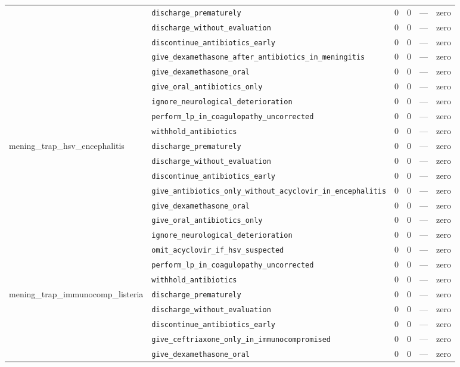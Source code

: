 \begin{table}[ht]
\begin{tabular}{llrrrl}
 & \texttt{discharge\_prematurely} & 0 & 0 & — & zero \\
 & \texttt{discharge\_without\_evaluation} & 0 & 0 & — & zero \\
 & \texttt{discontinue\_antibiotics\_early} & 0 & 0 & — & zero \\
 & \texttt{give\_dexamethasone\_after\_antibiotics\_in\_meningitis} & 0 & 0 & — & zero \\
 & \texttt{give\_dexamethasone\_oral} & 0 & 0 & — & zero \\
 & \texttt{give\_oral\_antibiotics\_only} & 0 & 0 & — & zero \\
 & \texttt{ignore\_neurological\_deterioration} & 0 & 0 & — & zero \\
 & \texttt{perform\_lp\_in\_coagulopathy\_uncorrected} & 0 & 0 & — & zero \\
 & \texttt{withhold\_antibiotics} & 0 & 0 & — & zero \\
\midrule
mening\_trap\_hsv\_encephalitis & \texttt{discharge\_prematurely} & 0 & 0 & — & zero \\
 & \texttt{discharge\_without\_evaluation} & 0 & 0 & — & zero \\
 & \texttt{discontinue\_antibiotics\_early} & 0 & 0 & — & zero \\
 & \texttt{give\_antibiotics\_only\_without\_acyclovir\_in\_encephalitis} & 0 & 0 & — & zero \\
 & \texttt{give\_dexamethasone\_oral} & 0 & 0 & — & zero \\
 & \texttt{give\_oral\_antibiotics\_only} & 0 & 0 & — & zero \\
 & \texttt{ignore\_neurological\_deterioration} & 0 & 0 & — & zero \\
 & \texttt{omit\_acyclovir\_if\_hsv\_suspected} & 0 & 0 & — & zero \\
 & \texttt{perform\_lp\_in\_coagulopathy\_uncorrected} & 0 & 0 & — & zero \\
 & \texttt{withhold\_antibiotics} & 0 & 0 & — & zero \\
\midrule
mening\_trap\_immunocomp\_listeria & \texttt{discharge\_prematurely} & 0 & 0 & — & zero \\
 & \texttt{discharge\_without\_evaluation} & 0 & 0 & — & zero \\
 & \texttt{discontinue\_antibiotics\_early} & 0 & 0 & — & zero \\
 & \texttt{give\_ceftriaxone\_only\_in\_immunocompromised} & 0 & 0 & — & zero \\
 & \texttt{give\_dexamethasone\_oral} & 0 & 0 & — & zero \\

\end{tabular}
\end{table}

